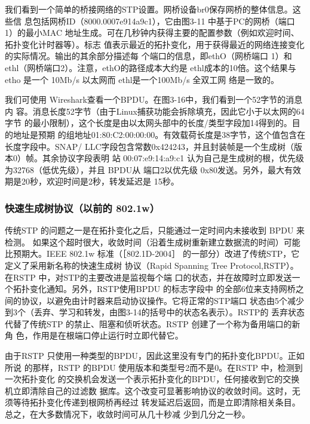 我们看到一个简单的桥接网络的STP设置。网桥设备br0保存网桥的整体信息。这些信
息包括网桥ID（8000.0007e914a9c1），它由图3-11 中基于PC的网桥（端口 1）的最小MAC
地址生成。可在几秒钟内获得主要的配置参数（例如欢迎时间、拓扑变化计时器等）。标志
值表示最近的拓扑变化，用于获得最近的网络连接变化的实际情况。输出的其余部分描述每
个端口的信息，即ethO（网桥端口 1）和 ethl（网桥端口2）。注意，ethO的路径成本大约是
ethl成本的10倍。这个结果与 etho 是一个 10Mb/s 以太网而 ethl是一个100Mb/s 全双工网
络是一致的。

我们可使用 Wireshark查看一个BPDU。在图3-16中，我们看到一个52字节的消息内
容。消息长度52字节（由于Linux捕获功能会拆除填充，因此它小于以太网的64字节
的最小限制），这个长度是由以太网头部中的长度/类型字段加14得到的。目的地址是预期
的组地址01:80:C2:00:00:00。有效载荷长度是38字节，这个值包含在长度字段中。SNAP/
LLC字段包含常数0x424243，并且封装帧是一个生成树（版本0）帧。其余协议字段表明
站 00:07:e9:14:a9:c1 认为自己是生成树的根，优先级为32768（低优先级），并且 BPDU从
端口2以优先级 0x80发送。另外，最大有效期是20秒，欢迎时间是2秒，转发延迟是
15秒。

\subsubsection{快速生成树协议（以前的 802.1w）}

传统STP 的问题之一是在拓扑变化之后，只能通过一定时间内未接收到 BPDU 来检测。
如果这个超时很大，收敛时间（沿着生成树重新建立数据流的时间）可能比预期大。IEEE
802.1w 标准（［802.1D-2004］ 的一部分）改进了传统STP，它定义了采用新名称的快速生成树
协议（Rapid Spanning Tree Protocol,RSTP）。在RSTP 中，对STP的主要改进是监视每个端
口的状态，并在故障时立即发送一个拓扑变化通知。另外，RSTP使用BPDU 的标志字段中
的全部6位来支持网桥之间的协议，以避免由计时器来启动协议操作。它将正常的STP端口
状态由5个减少到3个（丢弃、学习和转发，由图3-14的括号中的状态名表示）。RSTP的
丢弃状态代替了传统STP 的禁止、阻塞和侦听状态。RSTP 创建了一个称为备用端口的新角
色，作用是在根端口停止运行时立即代替它。

由于RSTP 只使用一种类型的BPDU，因此这里没有专门的拓扑变化BPDU。正如所说
的那样，RSTP 的BPDU 使用版本和类型号2而不是0。在RSTP 中，检测到一次拓扑变化
的交换机会发送一个表示拓扑变化的BPDU，任何接收到它的交换机立即清除自己的过滤数
据库。这个改变可显著影响协议的收敛时间。这时，无须等待拓扑变化传递到根网桥再经过
转发延迟后返回，而是立即清除相关条目。总之，在大多数情况下，收敛时间可从几十秒减
少到几分之一秒。

